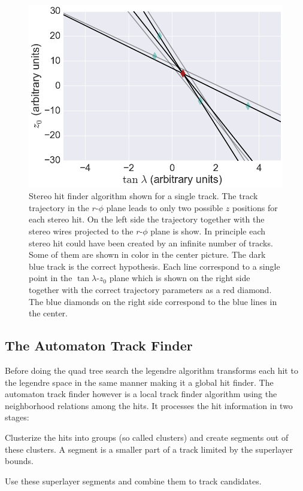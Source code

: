 \begin{figure}
 \includegraphics[scale=0.2]{figures/theory/stereo_3.png}
 \caption{Stereo hit finder algorithm shown for a single track. The track trajectory in the $r$-$\phi$ plane leads to only two possible $z$ positions for each stereo hit. On the left side the trajectory together with the stereo wires projected to the $r$-$\phi$ plane is show. In principle each stereo hit could have been created by an infinite number of tracks. Some of them are shown in color in the center picture. The dark blue track is the correct hypothesis. Each line correspond to a single point in the $\tan \lambda$-$z_0$ plane which is shown on the right side together with the correct trajectory parameters as a red diamond. The blue diamonds on the right side correspond to the blue lines in the center.}
 \label{fig-stereo-explained}
\end{figure}


\subsection{The Automaton Track Finder}
Before doing the quad tree search the legendre algorithm transforms each hit to the legendre space in the same manner making it a global hit finder. The automaton track finder however is a local track finder algorithm using the neighborhood relations among the hits. It processes the hit information in two stages:
\begin{zlist}
  \item Clusterize the hits into groups (so called clusters) and create segments out of these clusters. A segment is a smaller part of a track limited by the superlayer bounds. 
  \item Use these superlayer segments and combine them to track candidates.
\end{zlist}


